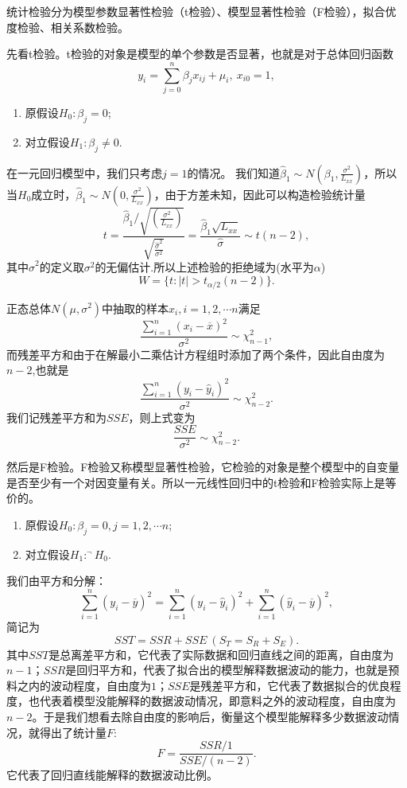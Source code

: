 \documentclass[lang=cn,10pt]{elegantbook}
\begin{document}
    统计检验分为模型参数显著性检验（t检验）、模型显著性检验（F检验），拟合优度检验、相关系数检验。

    先看t检验。t检验的对象是模型的单个参数是否显著，也就是对于总体回归函数
    \[y_i=\sum_{j=0}^{n}\beta_jx_{ij}+\mu_i,\ x_{i0}=1,\]
    \begin{enumerate}
        \item 原假设\(H_0:\beta_j=0\);
        \item 对立假设\(H_1:\beta_j\ne0\).
    \end{enumerate}
    在一元回归模型中，我们只考虑\(j=1\)的情况。
    我们知道\(\hat{\beta}_1\sim N(\beta_1,\frac{\sigma^2}{L_{xx}})\)，所以当\(H_0\)成立时，\(\hat{\beta}_1\sim N(0,\frac{\sigma^2}{L_{xx}})\)，由于方差未知，因此可以构造检验统计量
    \[t=\frac{\hat{\beta}_1/\sqrt{(\frac{\sigma^2}{L_{xx}})}}{\sqrt{\frac{\hat{\sigma}^2}{\sigma^2}}}=\frac{\hat{\beta}_1\sqrt{L_{xx}}}{\hat{\sigma}}\sim t(n-2),\]
    其中\(\hat{\sigma}^2\)的定义取\(\sigma^2\)的无偏估计.所以上述检验的拒绝域为(水平为\(\alpha\))
    \[W=\{t:|t|>t_{\alpha/2}(n-2)\}.\]
    \begin{note}
        正态总体\(N(\mu,\sigma^2)\)中抽取的样本\(x_i,i=1,2,\cdots n\)满足
        \[\frac{\sum_{i=1}^{n}(x_i-\overline{x})^2}{\sigma^2}\sim \chi^2_{n-1},\]
        而残差平方和由于在解最小二乘估计方程组时添加了两个条件，因此自由度为\(n-2\),也就是
        \[\frac{\sum_{i=1}^{n}(y_i-\hat{y}_i)^2}{\sigma^2}\sim \chi^2_{n-2}.\]
        我们记残差平方和为\(SSE\)，则上式变为
        \[\frac{SSE}{\sigma^2}\sim \chi^2_{n-2}.\]
    \end{note}

    然后是F检验。F检验又称模型显著性检验，它检验的对象是整个模型中的自变量是否至少有一个对因变量有关。所以一元线性回归中的t检验和F检验实际上是等价的。
    \begin{enumerate}
        \item 原假设\(H_0:\beta_j=0,j=1,2,\cdots n\);
        \item 对立假设\(H_1:^\neg H_0\).
    \end{enumerate}
    我们由平方和分解：
    \[\sum_{i=1}^{n}(y_i-\overline{y})^2=\sum_{i=1}^{n}(y_i-\hat{y}_i)^2+\sum_{i=1}^{n}(\hat{y}_i-\overline{y})^2,\]
    简记为
    \[SST=SSR+SSE\ (S_T=S_R+S_E).\]
    其中\(SST\)是总离差平方和，它代表了实际数据和回归直线之间的距离，自由度为\(n-1\)；\(SSR\)是回归平方和，代表了拟合出的模型解释数据波动的能力，也就是预料之内的波动程度，自由度为\(1\)；\(SSE\)是残差平方和，它代表了数据拟合的优良程度，也代表着模型没能解释的数据波动情况，即意料之外的波动程度，自由度为\(n-2\)。于是我们想看去除自由度的影响后，衡量这个模型能解释多少数据波动情况，就得出了统计量\(F\):
    \[F=\frac{SSR/1}{SSE/(n-2)}.\]
    它代表了回归直线能解释的数据波动比例。
\end{document}
